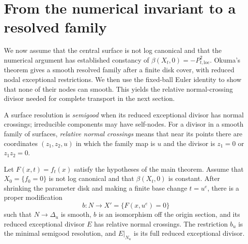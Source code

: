 \section{From the numerical invariant to a resolved family}
\label{sec:resolution}

We now assume that the central surface is not log canonical and that
the numerical argument has established constancy of
$\beta(X_t,0)=-P_{t,\mathrm{loc}}^2$.  Okuma's theorem gives a smooth
resolved family after a finite disk cover, with reduced nodal exceptional
restrictions.  We then use the fixed-ball Euler identity to show that
none of their nodes can smooth.  This yields the relative normal-crossing
divisor needed for complete transport in the next section.

A surface resolution is \emph{semigood} when its reduced exceptional
divisor has normal crossings; irreducible components may have self-nodes.
For a divisor in a smooth family of surfaces, \emph{relative normal
crossings} means that near its points there are coordinates $(z_1,z_2,u)$
in which the family map is $u$ and the divisor is $z_1=0$ or $z_1z_2=0$.

\begin{proposition}\label{prop:resolved-family}
Let $F(x,t)=f_t(x)$ satisfy the hypotheses of the main theorem.  Assume
that $X_0=\{f_0=0\}$ is not log canonical and that $\beta(X_t,0)$ is
constant.  After shrinking the parameter disk and making a finite base
change $t=u^e$, there is a proper modification
\[
 b:N\longrightarrow X'=\{F(x,u^e)=0\}
\]
such that $N\to\Delta_u$ is smooth, $b$ is an isomorphism off the origin
section, and its reduced exceptional divisor $E$ has relative normal
crossings.  The restriction $b_u$ is the minimal semigood resolution,
and $E|_{N_u}$ is its full reduced exceptional divisor.
\end{proposition}

